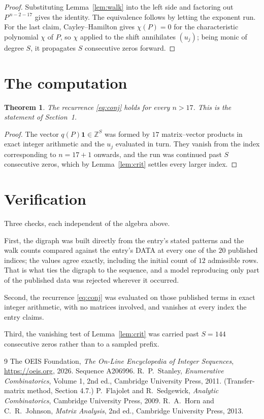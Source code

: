\documentclass[11pt,a4paper]{article}
\theoremstyle{plain}
\newtheorem{theorem}{Theorem}
\theoremstyle{definition}
\begin{document}
\begin{proof}
Substituting Lemma~\ref{lem:walk} into the left side and factoring out
$P^{\,n-2-17}$ gives the identity. The equivalence follows by letting the exponent
run. For the last claim, Cayley--Hamilton gives $\chi(P)=0$ for the characteristic
polynomial $\chi$ of $P$, so $\chi$ applied to the shift annihilates $(u_j)$; being monic of
degree $S$, it propagates $S$ consecutive zeros forward.
\end{proof}

\section{The computation}

\begin{theorem}
The recurrence \eqref{eq:conj} holds for every $n>17$. This is the statement of
Section~1.
\end{theorem}

\begin{proof}
The vector $q(P)\mathbf{1}\in\mathbb{Z}^{S}$ was formed by $17$ matrix--vector
products in exact integer arithmetic and the $u_j$ evaluated in turn. They vanish from the
index corresponding to $n=17+1$ onwards, and the run was continued past $S$ consecutive
zeros, which by Lemma~\ref{lem:crit} settles every larger index.
\end{proof}

\section{Verification}

Three checks, each independent of the algebra above.

First, the digraph was built directly from the entry's stated patterns and the walk counts
compared against the entry's DATA at every one of the $20$ published indices; the
values agree exactly, including the initial count of $12$ admissible rows. That is
what ties the digraph to the sequence, and a model reproducing only part of the published
data was rejected wherever it occurred.

Second, the recurrence \eqref{eq:conj} was evaluated on those published terms in exact
integer arithmetic, with no matrices involved, and vanishes at every index the entry claims.

Third, the vanishing test of Lemma~\ref{lem:crit} was carried past $S=144$ consecutive
zeros rather than to a sampled prefix.

\begin{thebibliography}{9}
 The OEIS Foundation, \emph{The On-Line Encyclopedia of Integer
Sequences}, \url{https://oeis.org}, 2026. Sequence A206996.
 R.~P.~Stanley, \emph{Enumerative Combinatorics}, Volume 1, 2nd ed.,
Cambridge University Press, 2011. (Transfer-matrix method, Section 4.7.)
 P.~Flajolet and R.~Sedgewick, \emph{Analytic Combinatorics}, Cambridge
University Press, 2009.
 R.~A.~Horn and C.~R.~Johnson, \emph{Matrix Analysis}, 2nd ed., Cambridge
University Press, 2013.
\end{thebibliography}
\end{document}
